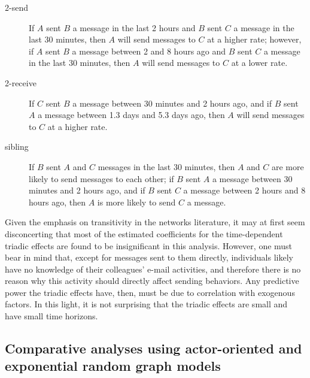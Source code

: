 \documentclass[final]{statsoc}
\begin{document}
\begin{description}

\item[2-send] If $A$ sent $B$ a message in the last 2 hours and $B$ sent $C$ a message in the last 30 minutes, then $A$ will send messages to $C$ at a higher rate; however, if $A$ sent $B$ a message between 2 and 8 hours ago and $B$ sent $C$ a message in the last 30 minutes, then $A$ will send messages to $C$ at a lower rate.

\item[2-receive] If $C$ sent $B$ a message between 30 minutes and 2 hours ago, and if $B$ sent $A$ a message between 1.3 days and 5.3 days ago, then $A$ will send messages to $C$ at a higher rate.

\item[sibling] If $B$ sent $A$ and $C$ messages in the last 30 minutes, then $A$ and $C$ are more likely to send messages to each other; if $B$ sent $A$ a message between 30 minutes and 2 hours ago, and if $B$ sent $C$ a message between 2 hours and 8 hours ago, then $A$ is more likely to send $C$ a message.

\end{description}

Given the emphasis on transitivity in the networks literature, it may at first seem disconcerting that most of the estimated coefficients for the time-dependent triadic effects are found to be insignificant in this analysis.  However, one must bear in mind that, except for  messages sent to them directly, individuals likely have no knowledge of their colleagues' e-mail activities, and therefore there is no reason why this activity should directly affect sending behaviors.  Any predictive power the triadic effects have, then, must be due to correlation with
exogenous factors.  In this light, it is not surprising that the triadic effects are small and have small time horizons.

\subsection{Comparative analyses using actor-oriented and exponential random graph models}\label{sec:actor-oriented}
\end{document}
